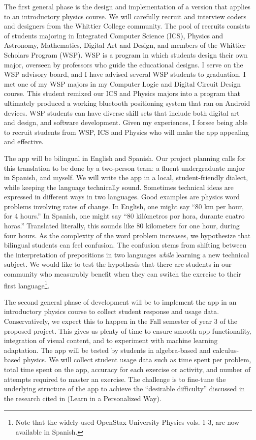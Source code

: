 \documentclass[11pt]{amsart}
\begin{document}
The first general phase is the design and implementation of a version that applies to an introductory physics course.  We will carefully recruit and interview coders and designers from the Whittier College community.  The pool of recruits consists of students majoring in Integrated Computer Science (ICS), Physics and Astronomy, Mathematics, Digital Art and Design, and members of the Whittier Scholars Program (WSP).  WSP is a program in which students design their own major, overseen by professors who guide the educational designs.  I serve on the WSP advisory board, and I have advised several WSP students to graduation.  I met one of my WSP majors in my Computer Logic and Digital Circuit Design course.  This student remixed our ICS and Physics majors into a program that ultimately produced a working bluetooth positioning system that ran on Android devices.  WSP students can have diverse skill sets that include both digital art and design, and software development.  Given my experiences, I forsee being able to recruit students from WSP, ICS and Physics who will make the app appealing and effective. 

The app will be bilingual in English and Spanish.  Our project planning calls for this translation to be done by a two-person team: a fluent undergraduate major in Spanish, and myself.  We will write the app in a local, student-friendly dialect, while keeping the language technically sound.  Sometimes technical ideas are expressed in different ways in two languages.  Good examples are physics word problems involving rates of change.  In English, one might say ``80 km per hour, for 4 hours.''  In Spanish, one might say ``80 kil\'{o}metros por hora, durante cuatro horas.''  Translated literally, this sounds like 80 kilometers for one hour, during four hours.  As the complexity of the word problem increases, we hypothesize that bilingual students can feel confusion.  The confusion stems from shifting between the interpretation of prepositions in two languages \textit{while} learning a new technical subject.  We would like to test the hypothesis that there are students in our community who measurably benefit when they can switch the exercise to their first language\footnote{Note that the widely-used OpenStax University Physics vols. 1-3, are now available in Spanish.}.

The second general phase of development will be to implement the app in an introductory physics course to collect student response and usage data.  Conservatively, we expect this to happen in the Fall semester of year 3 of the proposed project.  This gives us plenty of time to ensure smooth app functionality, integration of visual content, and to experiment with machine learning adaptation.  The app will be tested by students in algebra-based and calculus-based physics.  We will collect student usage data such as time spent per problem, total time spent on the app, accuracy for each exercise or activity, and number of attempts required to master an exercise.  The challenge is to fine-tune the underlying structure of the app to achieve the ``desirable difficulty'' discussed in the research cited in \cite{duolingo_whitepaper} (Learn in a Personalized Way).  
\end{document}
